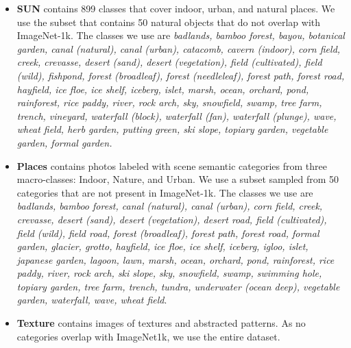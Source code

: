 \begin{itemize}
    \item 
        \textbf{SUN} contains 899 classes that cover indoor, urban, and natural places. 
        We use the subset that contains 50 natural objects that do not overlap with ImageNet-1k. 
        The classes we use are \textit{badlands, bamboo forest, bayou, botanical garden, canal (natural), canal (urban), catacomb, cavern (indoor), corn field, creek, crevasse, desert (sand), desert (vegetation), field (cultivated), field (wild), fishpond, forest (broadleaf), forest (needleleaf), forest path, forest road, hayfield, ice floe, ice shelf, iceberg, islet, marsh, ocean, orchard, pond, rainforest, rice paddy, river, rock arch, sky, snowfield, swamp, tree farm, trench, vineyard, waterfall (block), waterfall (fan), waterfall (plunge), wave, wheat field, herb garden, putting green, ski slope, topiary garden, vegetable garden, formal garden.}
    \item 
        \textbf{Places} contains photos labeled with scene semantic categories from three macro-classes: Indoor, Nature, and Urban. 
        We use a subset sampled from 50 categories that are not present in ImageNet-1k. 
        The classes we use are 
        \textit{badlands, bamboo forest, canal (natural), canal (urban), corn field, creek, crevasse, desert (sand), desert (vegetation), desert road, field (cultivated), field (wild), field road, forest (broadleaf), forest path, forest road, formal garden, glacier, grotto, hayfield, ice floe, ice shelf, iceberg, igloo, islet, japanese garden, lagoon, lawn, marsh, ocean, orchard, pond, rainforest, rice paddy, river, rock arch, ski slope, sky, snowfield, swamp, swimming hole, topiary garden, tree farm, trench, tundra, underwater (ocean deep), vegetable garden, waterfall, wave, wheat field}.
    \item 
        \textbf{Texture} contains images of textures and abstracted patterns. As no categories overlap with ImageNet1k, we use the entire dataset.
\end{itemize}


























